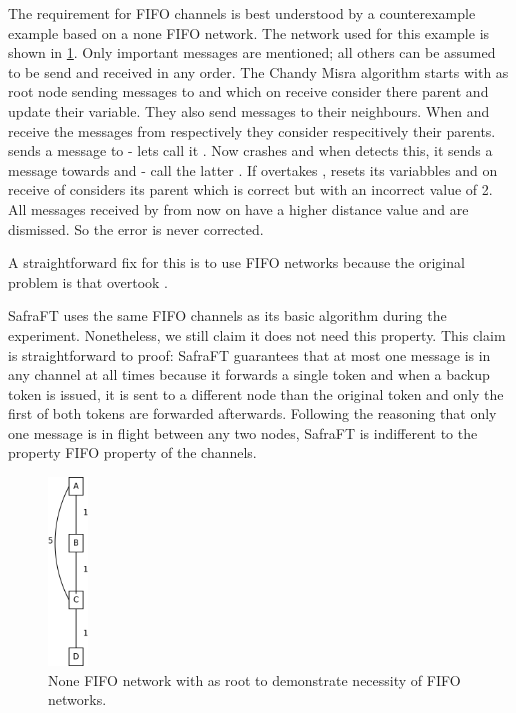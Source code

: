 The requirement for FIFO channels is best understood by a counterexample example based on a none FIFO network.
The network used for this example is shown in \cref{fig:fifoNecessaryNetwork}. 
Only important messages are mentioned; all others can be assumed to be send and received in any order.
The Chandy Misra algorithm starts with  as root node sending  messages to  and  which on receive consider  there parent and update their  variable.
They also send  messages to their neighbours. 
When  and  receive the  messages from  respectively  they consider  respecitively  their parents.
 sends a  message to  - lets call it .
Now  crashes and when  detects this, it sends a  message towards  and  - call the latter .
If  overtakes ,  resets its variabbles and on receive of  considers  its parent which is correct but with an incorrect  value of 2.
All  messages received by  from now on have a higher distance value and are dismissed. 
So the error is never corrected.

A straightforward fix for this is to use FIFO networks because the original problem is that  overtook .

SafraFT uses the same FIFO channels as its basic algorithm during the experiment.
Nonetheless, we still claim it does not need this property.
This claim is straightforward to proof: SafraFT guarantees that at most one message is in any channel at all times because it forwards a single token and when a backup token is issued, it is sent to a different node than the original token and only the first of both tokens are forwarded afterwards.
Following the reasoning that only one message is in flight between any two nodes, SafraFT is indifferent to the property FIFO property of the channels.

\begin{figure}[h]
	\includegraphics[height=5cm]{figures/FIFO_necessary}
	\centering
	\caption{None FIFO network with  as root to demonstrate necessity of FIFO networks.}    
	\label{fig:fifoNecessaryNetwork}
\end{figure}

